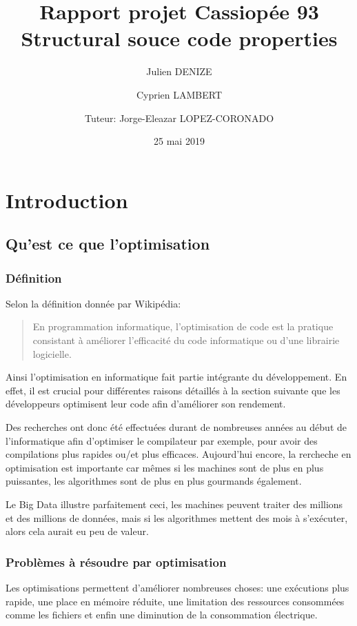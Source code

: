\documentclass[a4paper, titlepage]{report}
\title{Rapport projet Cassiopée 93\\ \large Structural souce code properties}      %
\author{Julien DENIZE \\ \and Cyprien LAMBERT \\ \and Tuteur: Jorge-Eleazar LOPEZ-CORONADO}           %
\date{25 mai 2019}           %
\begin{document}
\maketitle
\tableofcontents


\chapter{Introduction}
\section{Qu'est ce que l'optimisation}
\subsection{Définition}
Selon la définition donnée par Wikipédia:
\begin{quote}
    En programmation informatique, l'optimisation de code est la pratique consistant à améliorer l'efficacité du code informatique ou d'une librairie logicielle. \cite{wiki:Optimisation_de_code}
\end{quote}
Ainsi l'optimisation en informatique fait partie intégrante du développement. En effet, il est crucial pour différentes raisons détaillés à la section suivante que les développeurs optimisent leur code afin d'améliorer son rendement.

Des recherches ont donc été effectuées durant de nombreuses années au début de l'informatique afin d'optimiser le compilateur par exemple, pour avoir des compilations plus rapides ou/et plus efficaces. Aujourd'hui encore, la rercheche en optimisation est importante car mêmes si les machines sont de plus en plus puissantes, les algorithmes sont de plus en plus gourmands également.

Le Big Data illustre parfaitement ceci, les machines peuvent traiter des millions et des millions de données, mais si les algorithmes mettent des mois à s'exécuter, alors cela aurait eu peu de valeur.

\subsection{Problèmes à résoudre par optimisation}
Les optimisations permettent d'améliorer nombreuses choses: une exécutions plus rapide, une place en mémoire réduite, une limitation des ressources consommées comme les fichiers et enfin une diminution de la consommation électrique.
\end{document}
